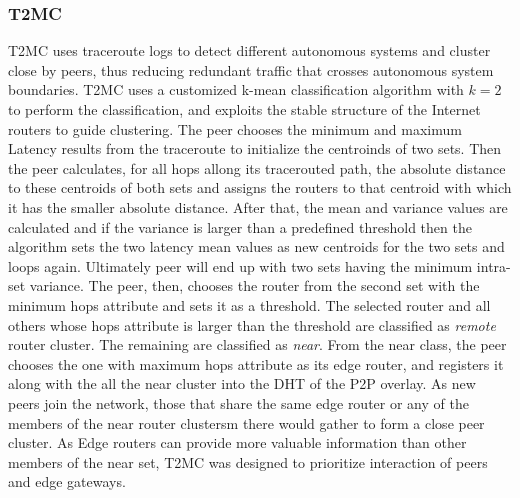 \subsubsection{T2MC}
T2MC \cite{shi_t2mc_2008} uses traceroute logs to detect different autonomous
systems and cluster close by peers, thus reducing redundant traffic that crosses
autonomous system boundaries. T2MC uses a customized k-mean classification
algorithm with $k=2$ to perform the classification, and exploits the stable
structure of the Internet routers to guide clustering. The peer chooses the
minimum and maximum Latency results from the traceroute to initialize the
centroinds of two sets. Then the peer calculates, for all hops allong its
tracerouted path, the absolute distance to these centroids of both sets and
assigns the routers to that centroid with which it has the smaller absolute
distance. After that, the mean and variance values are calculated and if the
variance is larger than a predefined threshold then the algorithm sets the two
latency mean values as new centroids for the two sets and loops again.
Ultimately peer will end up with two sets having the minimum intra-set variance.
The peer, then, chooses the router from the second set with the minimum hops
attribute and sets it as a threshold. The selected router and all others whose
hops attribute is larger than the threshold are classified as \emph{remote}
router cluster. The remaining are classified as \emph{near}. From the near
class, the peer chooses the one with maximum hops attribute as its edge router,
and registers it along with the all the near cluster into the DHT of the P2P
overlay. As new peers join the network, those that share the same edge router
or any of the members of the near router clustersm there would gather to form a
close peer cluster. As Edge routers can provide more valuable information than
other members of the near set, T2MC was designed to prioritize interaction of
peers and edge gateways.

%
%
%

